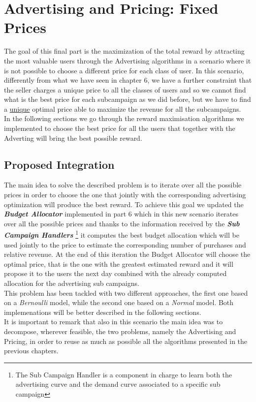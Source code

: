 \chapter{Advertising and Pricing: Fixed Prices}

The goal of this final part is the maximization of the total reward by attracting the most valuable users through the Advertising algorithms in a scenario where it is not possible to choose a different price for each class of user. In this scenario, differently from what we have seen in chapter 6, we have a further constraint that the seller charges a unique price to all the classes of users and so we cannot find what is the best price for each subcampaign as we did before, but we have to find a \underline{unique} optimal price able to maximize the revenue for all the subcampaigns.\\ In the following sections we go through the reward maximisation algorithms we implemented to choose the best price for all the users that together with the Adverting will bring the best possible reward.


\section{Proposed Integration}
The main idea to solve the described problem is to iterate over all the possible prices in order to choose the one that jointly with the corresponding advertising optimization will produce the best reward.
To achieve this goal we updated the \textbf{\textit{Budget Allocator}} implemented in part 6 which in this new scenario iterates over all the possible prices and thanks to the information received by the \textbf{\textit{Sub Campaign Handlers}} \footnote{The Sub Campaign Handler is a component in charge to learn both the advertising curve and the demand curve associated to a specific sub campaign} it computes the best budget allocation which will be used jointly to the price to estimate the corresponding number of purchases and relative revenue. At the end of this iteration the Budget Allocator will choose the optimal price, that is the one with the greatest estimated reward and it will propose it to the users the next day combined with the already computed allocation for the advertising sub campaigns.\\ This problem has been tackled with two different approaches, the first one based on a \textit{Bernoulli} model, while the second one based on a \textit{Normal} model. Both implemenations will be better described in the following sections. \\It is important to remark that also in this scenario the main idea was to decompose, wherever feasible, the two problems, namely the Advertising and Pricing, in order to reuse as much as possible all the algorithms presented in the previous chapters.

